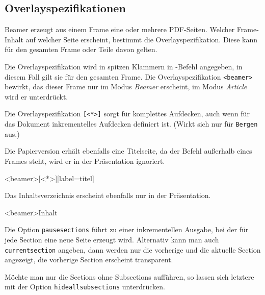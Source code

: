 \subsection{Overlayspezifikationen}

Beamer erzeugt aus einem Frame eine oder mehrere PDF-Seiten.
Welcher Frame-Inhalt auf welcher Seite erscheint, bestimmt die
Overlayspezifikation. Diese kann für den gesamten Frame oder Teile davon
gelten.

Die Overlayspezifikation wird in spitzen Klammern in -Befehl 
angegeben, in diesem Fall gilt sie für den gesamten Frame.
Die Overlayspezifikation \texttt{<beamer>} bewirkt, das dieser Frame nur im Modus
\textit{Beamer} erscheint, im Modus \textit{Article} wird er unterdrückt.

Die Overlayspezifikation \texttt{[<*>]} sorgt für komplettes Aufdecken, auch
wenn für das Dokument inkrementelles Aufdecken definiert ist. (Wirkt sich
nur für \texttt{Bergen} aus.) 

Die Papierversion erhält ebenfalls eine Titelseite, da der Befehl außerhalb
eines Frames steht, wird er in der Präsentation ignoriert.

\begin{lfgwcode}{}
\begin{frame}<beamer>[<*>][label=titel]{}
  \titlepage
\end{frame}

\maketitle %
\end{lfgwcode}

Das Inhaltsverzeichnis erscheint ebenfalls nur in der Präsentation.

\begin{lfgwcode}{}
\begin{frame}<beamer>{Inhalt}
   \tabelofcontents[pausesections]
\end{frame}
\end{lfgwcode}

Die Option \texttt{pausesections} führt zu einer inkrementellen Ausgabe, bei
der für jede Section eine neue Seite erzeugt wird. Alternativ kann man auch
\texttt{currentsection} angeben, dann werden nur die vorherige und die aktuelle Section
angezeigt, die vorherige Section erscheint transparent.

Möchte man nur die Sections ohne Subsections aufführen, 
so lassen sich letztere mit der Option \texttt{hideallsubsections} unterdrücken.

